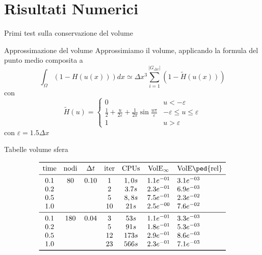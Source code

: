 \section{Risultati Numerici}
\begin{frame}{Primi test sulla conservazione del volume}
  \begin{block}{Approssimazione del volume}
    Approssimiamo il volume, applicando la formula del punto medio
    composita a
    \[
    \int_{\Omega}(1-H(u(x)))dx\simeq\Delta x^3\sum_{i=1}^{|G_{\Delta x}|}(1-\tilde{H}(u(x)))
    \]
    con
    \[
    \tilde{H}(u)=
    \begin{cases}
      0 &u<-\varepsilon \\
      \frac{1}{2}+\frac{u}{2\varepsilon}+\frac{1}{2\pi}\sin{\frac{u\pi}{\varepsilon}}
        &-\varepsilon\leq u\leq\varepsilon \\
        1 &u>\varepsilon
    \end{cases}
    \]
 con $\varepsilon=1.5\Delta x$
  \end{block}
\end{frame}

\begin{frame}{Tabelle volume sfera}
\begin{table}[htb!]
\caption{Tabella per lo schema VPMCM. Evoluzione di una sfera.}
\label{tab:cp4-sc1-01}
\[
\begin{array}{*{6}{c}l}
    \toprule
    \text{time} &\text{nodi} &\Delta t &\text{iter}
    &\text{CPUs}&\text{VolE$_{\infty}$} &\text{VolE\ped{rel}} \\
     \midrule
     0.1        & 80         & 0.10    & 1          & 1,0s
     &1.1e^{-01} & 3.1e^{-03} \\ 
     0.2        &            &         & 2          & 3.7s
     &2.3e^{-01} & 6.9e^{-03} \\
     0.5        &            &         & 5          & 8,8s
     &7.5e^{-01} & 2.3e^{-02} \\ 
     1.0        &            &         & 10         & 21s
     &2.5e^{-00} & 7.6e^{-02} \\
    \midrule
     0.1        & 180        & 0.04    & 3          & 53s
     &1.1e^{-01} & 3.3e^{-03} \\ 
     0.2        &            &         & 5          & 91s
     &1.8e^{-01} & 5.3e^{-03} \\
     0.5        &            &         & 12         & 173s
     &2.9e^{-01} & 8.6e^{-03}  \\ 
     1.0        &            &         & 23         & 566s
     &2.3e^{-01} & 7.1e^{-03}  \\
    \bottomrule
\end{array}
\]
\end{table}
\end{frame}

